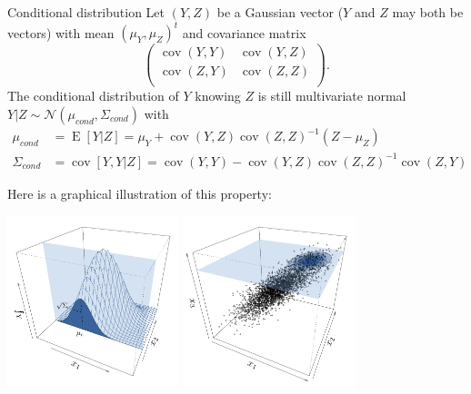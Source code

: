 \documentclass{beamer}
\DeclareMathOperator*{\E}{E}
\DeclareMathOperator*{\Cov}{cov}
\begin{document}
\begin{frame}{}
\begin{block}{Conditional distribution}
Let $(Y,Z)$ be a Gaussian vector ($Y$ and $Z$ may both be vectors) with mean $(\mu_Y,\mu_Z)^t$ and covariance matrix
\begin{equation*}
\begin{pmatrix}
	\Cov(Y,Y) & \Cov(Y,Z)\\
	\Cov(Z,Y) & \Cov(Z,Z)\\
\end{pmatrix}.
\end{equation*}
The conditional distribution of $Y$ knowing $Z$ is still multivariate normal $Y|Z \sim \mathcal{N}(\mu_{cond},\Sigma_{cond})$ with
\begin{equation*}
\begin{split}
	\mu_{cond} &= \E [Y|Z] = \mu_Y + \Cov(Y,Z) \Cov(Z,Z)^{-1} (Z-\mu_Z)\\ 
	\Sigma_{cond} &= \Cov [Y,Y|Z] = \Cov(Y,Y) - \Cov(Y,Z) \Cov(Z,Z)^{-1} \Cov(Z,Y)
\end{split}
\end{equation*}
\end{block}
\end{frame}

\begin{frame}{}
Here is a graphical illustration of this property:
\begin{center}
 \includegraphics[height=5cm]{figures/R/ch1_condpdf1} \qquad \includegraphics[height=5cm]{figures/R/ch1_condpdf2} 
\end{center}
\end{frame}
\end{document}
